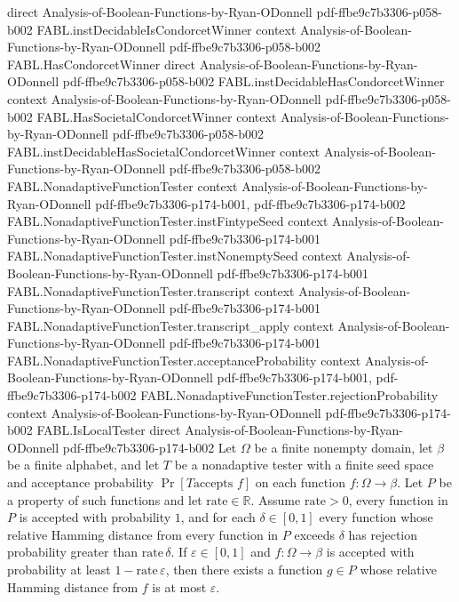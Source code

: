 \begin{theorem}
  {direct}
  {Analysis-of-Boolean-Functions-by-Ryan-ODonnell}
  {pdf-ffbe9c7b3306-p058-b002}
\proofstep
  {FABL.instDecidableIsCondorcetWinner}
  {context}
  {Analysis-of-Boolean-Functions-by-Ryan-ODonnell}
  {pdf-ffbe9c7b3306-p058-b002}
\proofstep
  {FABL.HasCondorcetWinner}
  {direct}
  {Analysis-of-Boolean-Functions-by-Ryan-ODonnell}
  {pdf-ffbe9c7b3306-p058-b002}
\proofstep
  {FABL.instDecidableHasCondorcetWinner}
  {context}
  {Analysis-of-Boolean-Functions-by-Ryan-ODonnell}
  {pdf-ffbe9c7b3306-p058-b002}
\proofstep
  {FABL.HasSocietalCondorcetWinner}
  {context}
  {Analysis-of-Boolean-Functions-by-Ryan-ODonnell}
  {pdf-ffbe9c7b3306-p058-b002}
\proofstep
  {FABL.instDecidableHasSocietalCondorcetWinner}
  {context}
  {Analysis-of-Boolean-Functions-by-Ryan-ODonnell}
  {pdf-ffbe9c7b3306-p058-b002}
\proofstep
  {FABL.NonadaptiveFunctionTester}
  {context}
  {Analysis-of-Boolean-Functions-by-Ryan-ODonnell}
  {pdf-ffbe9c7b3306-p174-b001,
    pdf-ffbe9c7b3306-p174-b002}
\proofstep
  {FABL.NonadaptiveFunctionTester.instFintypeSeed}
  {context}
  {Analysis-of-Boolean-Functions-by-Ryan-ODonnell}
  {pdf-ffbe9c7b3306-p174-b001}
\proofstep
  {FABL.NonadaptiveFunctionTester.instNonemptySeed}
  {context}
  {Analysis-of-Boolean-Functions-by-Ryan-ODonnell}
  {pdf-ffbe9c7b3306-p174-b001}
\proofstep
  {FABL.NonadaptiveFunctionTester.transcript}
  {context}
  {Analysis-of-Boolean-Functions-by-Ryan-ODonnell}
  {pdf-ffbe9c7b3306-p174-b001}
\proofstep
  {FABL.NonadaptiveFunctionTester.transcript_apply}
  {context}
  {Analysis-of-Boolean-Functions-by-Ryan-ODonnell}
  {pdf-ffbe9c7b3306-p174-b001}
\proofstep
  {FABL.NonadaptiveFunctionTester.acceptanceProbability}
  {context}
  {Analysis-of-Boolean-Functions-by-Ryan-ODonnell}
  {pdf-ffbe9c7b3306-p174-b001,
    pdf-ffbe9c7b3306-p174-b002}
\proofstep
  {FABL.NonadaptiveFunctionTester.rejectionProbability}
  {context}
  {Analysis-of-Boolean-Functions-by-Ryan-ODonnell}
  {pdf-ffbe9c7b3306-p174-b002}
\proofstep
  {FABL.IsLocalTester}
  {direct}
  {Analysis-of-Boolean-Functions-by-Ryan-ODonnell}
  {pdf-ffbe9c7b3306-p174-b002}
Let $\Omega$ be a finite nonempty domain, let $\beta$ be a finite alphabet, and let $T$
be a nonadaptive tester with a finite seed space and acceptance probability $\Pr[T\text{
accepts }f]$ on each function $f:\Omega\to\beta$. Let $P$ be a property of such
functions and let $\mathrm{rate}\in\mathbb R$. Assume $\mathrm{rate}>0$, every function
in $P$ is accepted with probability $1$, and for each $\delta\in[0,1]$ every function
whose relative Hamming distance from every function in $P$ exceeds $\delta$ has
rejection probability greater than $\mathrm{rate}\,\delta$. If $\varepsilon\in[0,1]$ and
$f:\Omega\to\beta$ is accepted with probability at least $1-\mathrm{rate}\,\varepsilon$,
then there exists a function $g\in P$ whose relative Hamming distance from $f$ is at
most $\varepsilon$.
\end{theorem}

